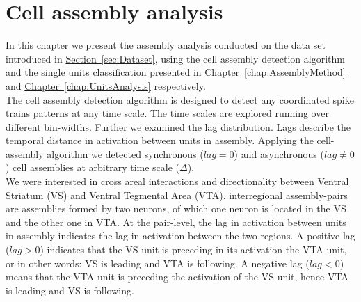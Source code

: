 \chapter{Cell assembly analysis}
\label{chap:AssemblyAnalysis}
In this chapter we present the assembly analysis conducted on the data set introduced in \hyperref[sec:Dataset]{Section~\ref*{sec:Dataset}}, using the cell assembly detection algorithm and the single units classification presented in \hyperref[chap:AssemblyMethod]{Chapter~\ref*{chap:AssemblyMethod}} and \hyperref[chap:UnitsAnalysis]{Chapter~\ref*{chap:UnitsAnalysis}} respectively.\\
The cell assembly detection algorithm is designed to detect any coordinated spike trains patterns at any time scale. The time scales are explored running over different bin-widths. Further we examined the lag distribution. Lags describe the temporal distance in activation between units in assembly. Applying the cell-assembly algorithm we detected synchronous ($lag=0$) and asynchronous ($lag\neq0$) cell assemblies at arbitrary time scale ($\Delta$).\\
We were interested in cross areal interactions and directionality between Ventral Striatum (VS) and Ventral Tegmental Area (VTA). interregional assembly-pairs are assemblies formed by two neurons, of which one neuron is located in  the VS and the other one in VTA. At the pair-level, the lag in activation between units in assembly indicates the lag in activation between the two regions. A positive lag ($lag>0$) indicates that the VS unit is preceding in its activation the VTA unit, or in other words: VS is leading and VTA is following. A negative lag ($lag<0$) means that the VTA unit is preceding the activation of the VS unit, hence VTA is leading and VS is following.
